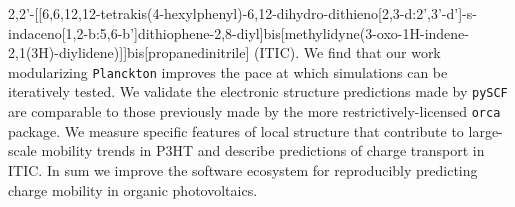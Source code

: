2,2'-[[6,6,12,12-tetrakis(4-hexylphenyl)-6,12-dihydro-dithieno[2,3-d:2',3'-d']-s-indaceno[1,2-b:5,6-b']dithiophene-2,8-diyl]bis[methylidyne(3-oxo-1H-indene-2,1(3H)-diylidene)]]bis[propanedinitrile] (ITIC).
We find that our work modularizing \texttt{Planckton} improves the pace at which simulations can be iteratively tested.
We validate the electronic structure predictions made by \texttt{pySCF} are comparable to those previously made by the more restrictively-licensed \texttt{orca} package.
We measure specific features of local structure that contribute to large-scale mobility trends in P3HT and describe predictions of charge transport in ITIC.
In sum we improve the software ecosystem for reproducibly predicting charge mobility in organic photovoltaics.

